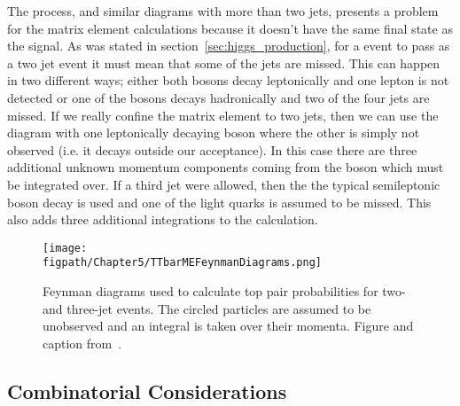 The \ttbar process, and similar diagrams with more than two jets, presents a problem for the matrix element calculations because it doesn't have the same final state as the signal.
As was stated in section~\ref{sec:higgs_production}, for a \ttbar event to pass as a two jet event it must mean that some of the jets are missed.
This can happen in two different ways; either both \W bosons decay leptonically and one lepton is not detected or one of the \W bosons decays hadronically and two of the four jets are missed.
If we really confine the matrix element to two jets, then we can use the diagram with one leptonically decaying \W boson where the other \W is simply not observed (i.e. it decays outside our acceptance).
In this case there are three additional unknown momentum components coming from the \W boson which must be integrated over.
If a third jet were allowed, then the the typical semileptonic \W boson decay is used and one of the light quarks is assumed to be missed.
This also adds three additional integrations to the calculation.

\begin{figure}[!hbt]
    \centering
    \texttt{[image: \\figpath/Chapter5/TTbarMEFeynmanDiagrams.png]}
    \caption{Feynman diagrams used to calculate top pair probabilities for two- and three-jet events. The circled particles are assumed to be unobserved and an integral is taken over their momenta. Figure and caption from~\cite{Dong2008}.}
    \label{fig:TTbarMEFeynmanDiagrams}
\end{figure}


\subsection{Combinatorial Considerations}


\begin{comment}
Peter:
Several of the diagrams have ambiguities in their final state: for example, the s-channel has two kinematically distinct bottom quarks in the final state. Choosing which jet should be matched to a given parton is difficult; this analysis solves the problem by calculating the differential cross section under both assumptions and adding the answers together. However, in the case of the t-channel diagram, the tagging information is used to match the final-state bottom quark to the tagged jet, improving the sensitivity of the calculation.

The combinations of matching jets to quarks are chosen based on the principle that heavy quarks should be matched to tagged jets whenever possible. In cases of ambiguity, all different combinations are tried. This is true except in the case of the top pair diagram, which has
too many ambiguities and is too computationally expensive to try all
combinations. In this case, only the two combinations of assigning tagged jets to bottom quarks are calculated.
\end{comment}



